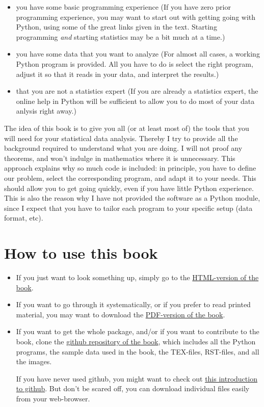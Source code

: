 \begin{itemize}
  \item you have some basic programming experience (If you have zero prior programming experience, you may want to start out with getting going with Python, using some of the great links given in the text. Starting programming \emph{and} starting statistics may be a bit much at a time.)
  \item you have some data that you want to analyze (For almost all cases, a working Python program is provided. All you have to do is select the right program, adjust it so that it reads in your data, and interpret the results.)
  \item that you are not a statistics expert (If you are already a statistics expert, the online help in Python will be sufficient to allow you to do most of your data anlysis right away.)
\end{itemize}


The idea of this book is to give you all (or at least most of) the tools
that you will need for your statistical data analysis. Thereby I try to
provide all the background required to understand what you are doing. I
will not proof any theorems, and won't indulge in mathematics where it
is unnecessary. This approach explains why so much code is included: in
principle, you have to define our problem, select the corresponding
program, and adapt it to your needs. This should allow you to get going
quickly, even if you have little Python experience. This is also the
reason why I have not provided the software as a Python module, since I
expect that you have to tailor each program to your specific setup (data
format, etc).

\section*{How to use this book}

\begin{itemize}
  \item If you just want to look something up, simply go to the \href{http://work.thaslwanter.at/Stats/html} {HTML-version of the book}.

  \item If you want to go through it systematically, or if you prefer to read
   printed material, you may want to download the \href{http://work.thaslwanter.at/Stats/StatsIntro.pdf} {PDF-version of the book}.

  \item If you want to get the whole package, and/or if you want to
   contribute to the book, clone the  \href{https://github.com/thomas-haslwanter/statsintro} {github repository of the
   book}, which  includes all the Python programs, the sample data used in the book,
   the TEX-files, RST-files, and all the images.

   If you have never used github, you might want to check out \href{https://help.github.com/articles/set-up-git} {this
   introduction to  github}. But don't be  scared off, you can download individual files easily from your
   web-browser.

\end{itemize}

